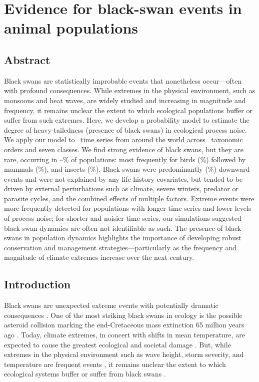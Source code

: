 \chapter[Ecological black swans]{Evidence for black-swan events in animal
  populations}

\section{Abstract}

Black swans are statistically improbable events that nonetheless occur---often
with profound consequences. While extremes in the physical environment, such
as monsoons and heat waves, are widely studied and increasing in magnitude and
frequency, it remains unclear the extent to which ecological populations
buffer or suffer from such extremes. Here, we develop a probability model to
estimate the degree of heavy-tailedness (presence of black swans) in
ecological process noise. We apply our model to \NPops~time series from around
the world across \NOrders~taxonomic orders and seven classes. We find strong
evidence of black swans, but they are rare, occurring in
\overallMinPerc--\overallMaxPerc\% of populations: most frequently for birds
(\AvesRangePerc\%) followed by mammals (\MammaliaRangePerc\%), and insects
(\InsectaRangePerc\%). Black swans were predominantly (\percBSDown \%)
downward events and were not explained by any life-history covariates, but
tended to be driven by external perturbations such as climate, severe winters,
predator or parasite cycles, and the combined effects of multiple factors.
Extreme events were more frequently detected for populations with longer time
series and lower levels of process noise; for shorter and noisier time series,
our simulations suggested black-swan dynamics are often not identifiable as
such. The presence of black swans in population dynamics highlights the
importance of developing robust conservation and management
strategies---particularly as the frequency and magnitude of climate extremes
increase over the next century.


\section{Introduction}

Black swans are unexpected extreme events with potentially dramatic
consequences \citep{taleb2007,sornette2009}. One of the most striking black
swans in ecology is the possible asteroid collision marking the end-Cretaceous
mass extinction 65 million years ago \citep{alvarez1980,harnik2012}. Today,
climate extremes, in concert with shifts in mean temperature, are expected to
cause the greatest ecological and societal damage \citep{ipcc2012}. But, while
extremes in the physical environment such as wave height, storm severity, and
temperature are frequent events \citep{gaines1993,katz2005}, it remains
unclear the extent to which ecological systems buffer or suffer from black
swans \citep{nunez2012}.

